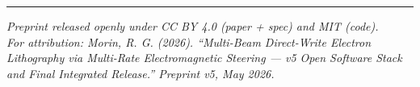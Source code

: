 \documentclass[11pt,letterpaper]{article}
\begin{document}
\vspace{1em}\hrule\vspace{0.5em}
\begin{center}
\textit{Preprint released openly under CC BY 4.0 (paper + spec) and MIT (code).}\\
\textit{For attribution: Morin, R. G. (2026). ``Multi-Beam Direct-Write Electron Lithography via Multi-Rate Electromagnetic Steering --- v5 Open Software Stack and Final Integrated Release.'' Preprint v5, May 2026.}
\end{center}
\end{document}
